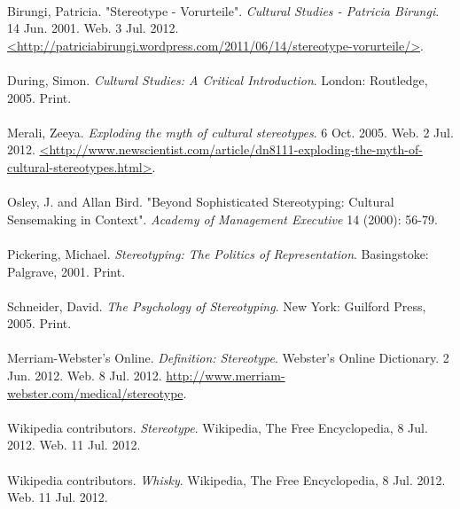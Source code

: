 \paragraph{}
Birungi, Patricia. "Stereotype - Vorurteile". \emph{Cultural Studies - Patricia Birungi}. 14 Jun. 2001. Web. 3 Jul. 2012. \url{<http://patriciabirungi.wordpress.com/2011/06/14/stereotype-vorurteile/>}.
\paragraph{}
During, Simon. \emph{Cultural Studies: A Critical Introduction}. London: Routledge, 2005. Print.
\paragraph{}
Merali, Zeeya. \emph{Exploding the myth of cultural stereotypes}. 6 Oct. 2005. Web. 2 Jul. 2012. \url{<http://www.newscientist.com/article/dn8111-exploding-the-myth-of-cultural-stereotypes.html>}.
\paragraph{}
Osley, J. and Allan Bird. "Beyond Sophisticated Stereotyping: Cultural Sensemaking in Context". \emph{Academy of Management Executive} 14 (2000): 56-79. 
\paragraph{}
Pickering, Michael. \emph{Stereotyping: The Politics of Representation}. Basingstoke: Palgrave, 2001. Print.
\paragraph{}
Schneider, David. \emph{The Psychology of Stereotyping}. New York: Guilford Press, 2005. Print.
\paragraph{}
Merriam-Webster's Online. \emph{Definition: Stereotype}. Webster's Online Dictionary. 2 Jun. 2012. Web. 8 Jul. 2012. \url{http://www.merriam-webster.com/medical/stereotype}.
\paragraph{}
Wikipedia contributors. \emph{Stereotype}. Wikipedia, The Free Encyclopedia, 8 Jul. 2012. Web. 11 Jul. 2012.
\paragraph{}
Wikipedia contributors. \emph{Whisky}. Wikipedia, The Free Encyclopedia, 8 Jul. 2012. Web. 11 Jul. 2012.

